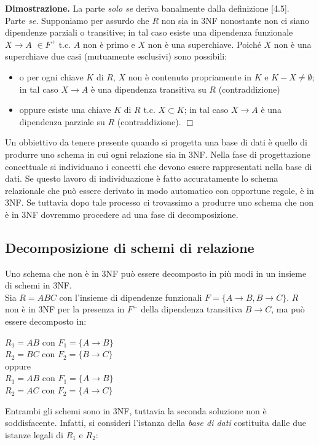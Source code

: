 \textbf{Dimostrazione.} La parte \emph{solo se} deriva banalmente dalla definizione [4.5].\\
Parte \emph{se.} Supponiamo per assurdo che $R$ non sia in 3NF nonostante non ci siano
dipendenze parziali o transitive; in tal caso esiste una dipendenza funzionale $X\rightarrow A$
$\in F^+$ t.c. $A$ non è primo e $X$ non è una superchiave. Poiché $X$ non è una
superchiave due casi (mutuamente esclusivi) sono possibili:
\begin{itemize}
 \item o per ogni chiave $K$ di $R$, $X$ non è contenuto propriamente in $K$ e $K-X \neq 
 \emptyset$; in tal caso $X\rightarrow A$ è una dipendenza transitiva su $R$ (contraddizione)
 \item oppure esiste una chiave $K$ di $R$ t.c. $X \subset K$; in tal caso $X\rightarrow A$ 
 è una dipendenza parziale su $R$ (contraddizione). $\Box$
\end{itemize}
Un obbiettivo da tenere presente quando si progetta una base di dati è quello di produrre 
uno schema in cui ogni relazione sia in 3NF. Nella fase di progettazione concettuale si 
individuano i concetti che devono essere rappresentati nella base di dati. Se questo lavoro 
di individuazione è fatto accuratamente lo schema relazionale che può essere derivato in modo
automatico con opportune regole, è in 3NF. Se tuttavia dopo tale processo ci trovassimo a 
produrre uno schema che non è in 3NF dovremmo procedere ad una fase di decomposizione.

\subsection{Decomposizione di schemi di relazione}
Uno schema che non è in 3NF può essere decomposto in più modi in un insieme di schemi in 3NF.\\
 Sia $R = ABC$ con l'insieme di dipendenze funzionali $F = \{A\rightarrow B, B\rightarrow C\}$.
$R$ non è in 3NF per la presenza in $F^+$ della dipendenza transitiva $B\rightarrow C$, ma può 
essere decomposto in:
\begin{center}
  $R_1 = AB$ con $F_1=\{A\rightarrow B\}$\\
  $R_2 = BC$ con $F_2=\{B\rightarrow C\}$\\
  oppure\\
  $R_1 = AB$ con $F_1=\{A\rightarrow B\}$\\
  $R_2 = AC$ con $F_2=\{A\rightarrow C\}$\\
\end{center}
Entrambi gli schemi sono in 3NF, tuttavia la seconda soluzione non è soddisfacente. Infatti,
si consideri l'istanza della \emph{base di dati} costituita dalle due istanze legali di $R_1$ e $R_2$:

